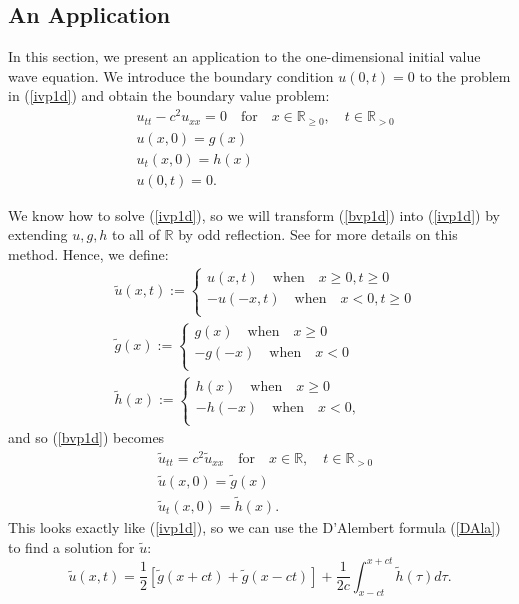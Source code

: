 \documentclass[a4paper, 12pt]{article}
\numberwithin{equation}{section}
\begin{document}
\subsection{An Application} \label{anapplication}
In this section, we present an application to the one-dimensional
initial value wave equation. We introduce the boundary condition $u(0,t)=0$
to the problem in (\ref{ivp1d}) and obtain the boundary value problem:
\begin{equation} \label{bvp1d}
    \begin{aligned}
    &u_{tt}-c^2u_{xx}=0 \quad \textrm {for} \quad x \in \mathbb{R}_{\ge 0}, \quad t \in \mathbb{R}_{>0}\\
    &u(x,0)=g(x)\\
    &u_t(x,0)=h(x)\\
    &u(0,t)=0.
    \end{aligned}
\end{equation}

We know how to solve (\ref{ivp1d}), so we will transform (\ref{bvp1d}) into (\ref{ivp1d})
by extending $u,g,h$ to all of $\mathbb{R}$ by odd reflection. See \cite[Ch. 2.4.1]{Ev} for
more details on this method. Hence, we define:
\begin{equation*}
    \begin{aligned}
        &\tilde{u}(x,t):=
        \begin{cases}
            u(x,t) \quad \textrm{when} \quad x \ge 0, t \ge 0\\
            -u(-x,t) \quad \textrm{when} \quad x<0, t \ge 0\\
        \end{cases}
        \\
        &\tilde{g}(x):=
        \begin{cases}
            g(x) \quad \textrm{when} \quad x \ge 0\\
            -g(-x) \quad \textrm{when} \quad x<0\\
        \end{cases}
        \\
        &\tilde{h}(x):=
        \begin{cases}
            h(x) \quad \textrm{when} \quad x \ge 0\\
            -h(-x) \quad \textrm{when} \quad x<0,\\
        \end{cases}
    \end{aligned}
\end{equation*}
and so (\ref{bvp1d}) becomes 
\begin{align*}
    &\tilde{u}_{tt}=c^2\tilde{u}_{xx} \quad \textrm {for} \quad x \in \mathbb{R}, \quad t \in \mathbb{R}_{>0} \\
    &\tilde{u}(x,0)=\tilde{g}(x)\\
    &\tilde{u}_t(x,0)=\tilde{h}(x).
\end{align*}
This looks exactly like (\ref{ivp1d}), so we can use the D'Alembert formula
(\ref{DAla}) to find a solution for $\tilde{u}$:
\begin{equation*}
    \tilde{u}(x,t)=\frac{1}{2}\left[\tilde{g}(x+ct)+\tilde{g}(x-ct)\right]+\frac{1}{2c}\int^{x+ct}_{x-ct}\tilde{h}(\tau)d\tau.
\end{equation*}
\end{document}
